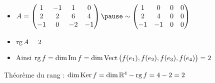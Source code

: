 \begin{frame}
\begin{exemple}
{\begin{itemize}
\pause  
  \item $A = \begin{pmatrix}
    1&-1&1&0\\
    2&2&6&4\\
    -1&0&-2&-1\\
  \end{pmatrix}
\pause  \sim 
  \begin{pmatrix}
    1&0&0&0\\
    2&4&0&0\\
    -1&-1&0&0\\
  \end{pmatrix}$

 \pause 
  \item $\mathop{\text{rg}}\nolimits A = 2$
 
 \pause 
  \item Ainsi $\mathop{\text{rg}}\nolimits f = \dim \mathop{\text{Im}}\nolimits f = \dim \mathop{\text{Vect}}\nolimits\big( f(e_1),f(e_2),f(e_3),f(e_4) \big) = 2$
  

\end{itemize}
}

\pause 
Théorème du rang : $\dim \mathop{\text{Ker}}\nolimits f = \dim \mathbb{R}^4 - \mathop{\text{rg}}\nolimits f = 4-2 =2$

\end{exemple}

\end{frame}



